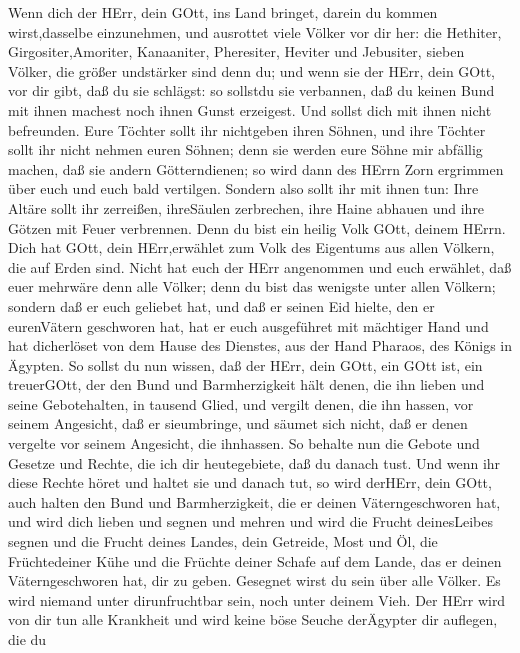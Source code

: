  Wenn dich der HErr, dein GOtt, ins Land bringet, darein du
kommen wirst,dasselbe einzunehmen, und ausrottet viele Völker vor dir
her: die Hethiter, Girgositer,Amoriter, Kanaaniter, Pheresiter, Heviter
und Jebusiter, sieben Völker, die größer undstärker sind denn du;
 und wenn sie der HErr, dein GOtt, vor dir gibt, daß du sie
schlägst: so sollstdu sie verbannen, daß du keinen Bund mit ihnen
machest noch ihnen Gunst erzeigest.  Und sollst dich mit
ihnen nicht befreunden. Eure Töchter sollt ihr nichtgeben ihren Söhnen,
und ihre Töchter sollt ihr nicht nehmen euren Söhnen;  denn
sie werden eure Söhne mir abfällig machen, daß sie andern Götterndienen;
so wird dann des HErrn Zorn ergrimmen über euch und euch bald vertilgen.
 Sondern also sollt ihr mit ihnen tun: Ihre Altäre sollt ihr
zerreißen, ihreSäulen zerbrechen, ihre Haine abhauen und ihre Götzen mit
Feuer verbrennen.  Denn du bist ein heilig Volk GOtt, deinem
HErrn. Dich hat GOtt, dein HErr,erwählet zum Volk des Eigentums aus
allen Völkern, die auf Erden sind.  Nicht hat euch der HErr
angenommen und euch erwählet, daß euer mehrwäre denn alle Völker; denn
du bist das wenigste unter allen Völkern;  sondern daß er
euch geliebet hat, und daß er seinen Eid hielte, den er eurenVätern
geschworen hat, hat er euch ausgeführet mit mächtiger Hand und hat
dicherlöset von dem Hause des Dienstes, aus der Hand Pharaos, des Königs
in Ägypten.  So sollst du nun wissen, daß der HErr, dein
GOtt, ein GOtt ist, ein treuerGOtt, der den Bund und Barmherzigkeit hält
denen, die ihn lieben und seine Gebotehalten, in tausend Glied,
 und vergilt denen, die ihn hassen, vor seinem Angesicht,
daß er sieumbringe, und säumet sich nicht, daß er denen vergelte vor
seinem Angesicht, die ihnhassen.  So behalte nun die Gebote
und Gesetze und Rechte, die ich dir heutegebiete, daß du danach tust.
 Und wenn ihr diese Rechte höret und haltet sie und danach
tut, so wird derHErr, dein GOtt, auch halten den Bund und
Barmherzigkeit, die er deinen Väterngeschworen hat,  und
wird dich lieben und segnen und mehren und wird die Frucht deinesLeibes
segnen und die Frucht deines Landes, dein Getreide, Most und Öl, die
Früchtedeiner Kühe und die Früchte deiner Schafe auf dem Lande, das er
deinen Väterngeschworen hat, dir zu geben.  Gesegnet wirst
du sein über alle Völker. Es wird niemand unter dirunfruchtbar sein,
noch unter deinem Vieh.  Der HErr wird von dir tun alle
Krankheit und wird keine böse Seuche derÄgypter dir auflegen, die du
